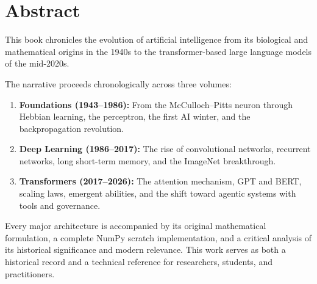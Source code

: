 \chapter*{Abstract}

This book chronicles the evolution of artificial intelligence from its biological and mathematical origins in the 1940s to the transformer-based large language models of the mid-2020s. 

The narrative proceeds chronologically across three volumes:

\begin{enumerate}
    \item \textbf{Foundations (1943–1986):} From the McCulloch--Pitts neuron through Hebbian learning, the perceptron, the first AI winter, and the backpropagation revolution.
    
    \item \textbf{Deep Learning (1986–2017):} The rise of convolutional networks, recurrent networks, long short-term memory, and the ImageNet breakthrough.
    
    \item \textbf{Transformers (2017–2026):} The attention mechanism, GPT and BERT, scaling laws, emergent abilities, and the shift toward agentic systems with tools and governance.
\end{enumerate}

Every major architecture is accompanied by its original mathematical formulation, a complete NumPy scratch implementation, and a critical analysis of its historical significance and modern relevance. This work serves as both a historical record and a technical reference for researchers, students, and practitioners.